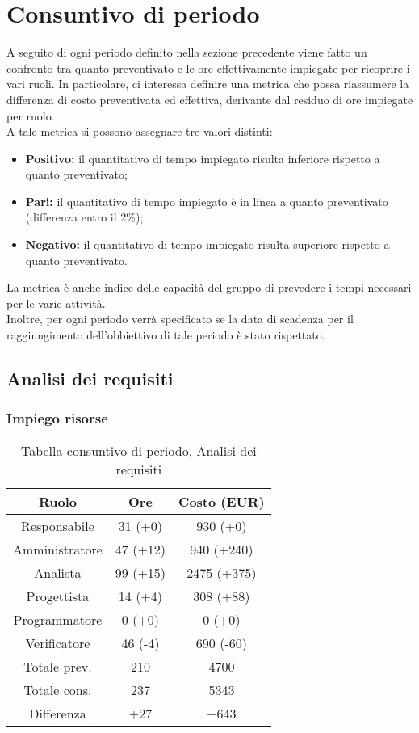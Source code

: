 \section{Consuntivo di periodo}
A seguito di ogni periodo definito nella sezione precedente viene fatto un confronto tra quanto preventivato e le ore effettivamente impiegate per ricoprire i vari ruoli. In particolare, ci interessa definire una metrica che possa riassumere la differenza di costo preventivata ed effettiva, derivante dal residuo di ore impiegate per ruolo. \\ A tale metrica si possono assegnare tre valori distinti:
\begin{itemize}
	\item \textbf{Positivo:} il quantitativo di tempo impiegato risulta inferiore rispetto a quanto preventivato;
	\item \textbf{Pari:} il quantitativo di tempo impiegato è in linea a quanto preventivato (differenza entro il 2\%);
	\item \textbf{Negativo:} il quantitativo di tempo impiegato risulta superiore rispetto a quanto preventivato.
\end{itemize}
La metrica è anche indice delle capacità del gruppo di prevedere i tempi necessari per le varie attività.
\\Inoltre, per ogni periodo verrà specificato se la data di scadenza per il raggiungimento dell'obbiettivo di tale periodo è stato rispettato.
\newpage
\subsection{Analisi dei requisiti}
\subsubsection{Impiego risorse}
\begin{table}[h]
\caption{Tabella consuntivo di periodo, Analisi dei requisiti}  
\begin{center}
\begin{tabular}{ |c|c|c|  }
 \hline
 Ruolo 		& Ore & Costo (EUR)\\
 \hline\hline
	Responsabile	& 31 (+0) & 930 (+0)\\
	Amministratore	& 47 (+12) & 940 (+240)\\
	Analista		& 99 (+15) & 2475 (+375)\\
	Progettista		& 14 (+4) & 308 (+88)\\
	Programmatore	& 0 (+0) & 0 (+0)\\
	Verificatore	& 46 (-4) & 690 (-60)\\
	\hline\hline
	Totale prev.	& 210 & 4700 \\
	Totale cons.	& 237 & 5343 \\
	Differenza		& +27 & +643 \\
 \hline
\end{tabular}
\end{center}
\end{table}
